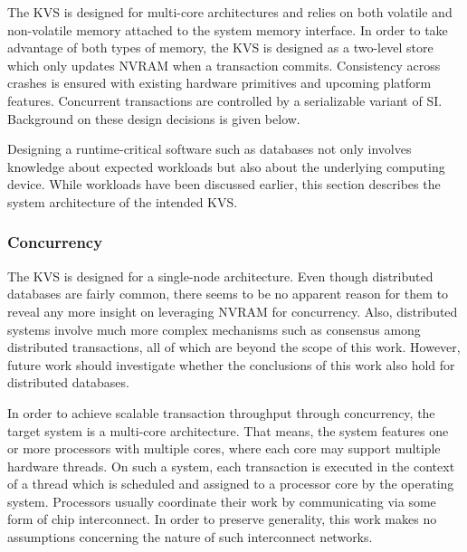 The \ac{KVS} is designed for multi-core architectures and relies on both
volatile and non-volatile memory attached to the system memory interface. In
order to take advantage of both types of memory, the \ac{KVS} is designed as a
two-level store which only updates \ac{NVRAM} when a transaction commits.
Consistency across crashes is ensured with existing hardware primitives and
upcoming platform features. Concurrent transactions are controlled by a
serializable variant of \ac{SI}. Background on these design decisions is given
below.

Designing a runtime-critical software such as databases not only involves
knowledge about expected workloads but also about the underlying computing
device. While workloads have been discussed earlier, this section describes the
system architecture of the intended \ac{KVS}.

\subsubsection{Concurrency}

The \ac{KVS} is designed for a single-node architecture. Even though distributed
databases are fairly common, there seems to be no apparent reason for them to
reveal any more insight on leveraging \ac{NVRAM} for concurrency. Also,
distributed systems involve much more complex mechanisms such as consensus among
distributed transactions, all of which are beyond the scope of this work.
However, future work should investigate whether the conclusions of this work
also hold for distributed databases.

In order to achieve scalable transaction throughput through concurrency, the
target system is a multi-core architecture. That means, the system features one
or more processors with multiple cores, where each core may support multiple
hardware threads. On such a system, each transaction is executed in the context
of a thread which is scheduled and assigned to a processor core by the operating
system. Processors usually coordinate their work by communicating via some form
of chip interconnect. In order to preserve generality, this work makes no
assumptions concerning the nature of such interconnect networks.

